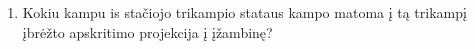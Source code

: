 \begin{enumerate}
  \item Kokiu kampu is stačiojo trikampio stataus kampo matoma
    į tą trikampį įbrėžto apskritimo projekcija į įžambinę?

\end{enumerate}
